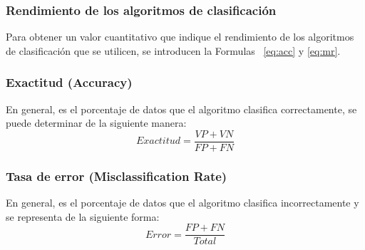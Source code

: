 \documentclass[10pt,a4paper]{article}
\begin{document}
\subsubsection{Rendimiento de los algoritmos de clasificación}
Para obtener un valor cuantitativo que indique el rendimiento de los algoritmos de clasificación que se utilicen, se introducen la Formulas ~\ref{eq:acc} y \ref{eq:mr}. 
\subsubsection*{Exactitud (Accuracy)}
En general, es el porcentaje de datos que el algoritmo clasifica correctamente, se puede determinar de la siguiente manera:
\begin{equation}
Exactitud = \frac{VP+VN}{FP+FN}
\label{eq:acc}
\end{equation}

\subsubsection*{Tasa de error (Misclassification Rate)}
En general, es el porcentaje de datos que el algoritmo clasifica incorrectamente y se representa de la siguiente forma:
\begin{equation}
Error = \frac{FP+FN}{Total}
\label{eq:mr}
\end{equation}
\end{document}
